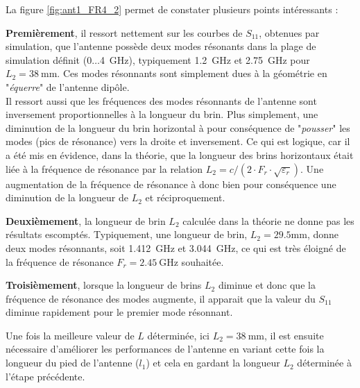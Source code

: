 \documentclass[Deriaz_Traiber_Labo02]{subfiles}
\begin{document}
\begin{flushleft}
	La figure \ref{fig:ant1_FR4_2} permet de constater plusieurs points intéressants :
\end{flushleft}
\begin{description}
\item \textbf{Premièrement}, il ressort nettement sur les courbes de $S_{11}$, obtenues par simulation, que l'antenne possède deux modes résonants dans la plage de simulation définit ($0\dots$\SI{4}{\giga\hertz}), typiquement \SI{1.2}{\giga\hertz} et \SI{2.75}{\giga\hertz} pour $L_2 = \SI{38}{\milli\meter}$. Ces modes résonnants sont simplement dues à la géométrie en "\textit{équerre}" de l'antenne dipôle.\\
Il ressort aussi que les fréquences des modes résonnants de l'antenne sont inversement proportionnelles à la longueur du brin. Plus simplement, une diminution de la longueur du brin horizontal à pour conséquence de "\textit{pousser}" les modes (pics de résonance) vers la droite et inversement. Ce qui est logique, car il a été mis en évidence, dans la théorie, que la longueur des brins horizontaux était liée à la fréquence de résonance par la relation  $L_2 = c/(2\cdot F_r \cdot \sqrt{\varepsilon_r})$. Une augmentation de la fréquence de résonance à donc bien pour conséquence une diminution de la longueur de $L_2$ et réciproquement.\\

\item \textbf{Deuxièmement}, la longueur de brin $L_2$ calculée dans la théorie ne donne pas les résultats escomptés. Typiquement, une longueur de brin, $L_2=29.5\si{\milli\meter}$, donne deux modes résonnants, soit \SI{1.412}{\giga\hertz} et \SI{3.044}{\giga\hertz}, ce qui est très éloigné de la fréquence de résonance $F_r=\SI{2.45}{\giga\hertz}$ souhaitée.\\

\item \textbf{Troisièmement}, lorsque la longueur de brins $L_2$ diminue et donc que la fréquence de résonance des modes augmente, il apparait que la valeur du $S_{11}$ diminue rapidement pour le premier mode résonnant.\\
\end{description}

\pagebreak

Une fois la meilleure valeur de $L$ déterminée, ici $L_2 = \SI{38}{\milli\meter}$, il est ensuite nécessaire d'améliorer les performances de l'antenne en variant cette fois la longueur du pied de l'antenne ($l_1$) et cela en gardant la longueur $L_2$ déterminée à l'étape précédente.\\
\end{document}
